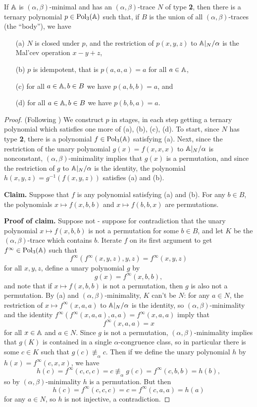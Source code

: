 \begin{appendices}
\begin{lem}\label{lem-pseudo-malcev} If $\mathbb{A}$ is $(\alpha,\beta)$-minimal and has an $(\alpha,\beta)$-trace $N$ of type \textbf{2}, then there is a ternary polynomial $p \in \operatorname{Pol}_3(\mathbb{A})$ such that, if $B$ is the union of all $(\alpha,\beta)$-traces (the ``body''), we have
\begin{itemize}
\item[(a)] $N$ is closed under $p$, and the restriction of $p(x,y,z)$ to $\mathbb{A}|_N/\alpha$ is the Mal'cev operation $x - y + z$,
\item[(b)] $p$ is idempotent, that is $p(a,a,a) = a$ for all $a \in \mathbb{A}$,
\item[(c)] for all $a \in \mathbb{A}, b \in B$ we have $p(a,b,b) = a$, and
\item[(d)] for all $a \in \mathbb{A}, b \in B$ we have $p(b,b,a) = a$.
\end{itemize}
\end{lem}
\begin{proof} (Following \cite{hobby-mckenzie}) We construct $p$ in stages, in each step getting a ternary polynomial which satisfies one more of (a), (b), (c), (d). To start, since $N$ has type \textbf{2}, there is a polynomial $f \in \operatorname{Pol}_3(\mathbb{A})$ satisfying (a). Next, since the restriction of the unary polynomial $g(x) = f(x,x,x)$ to $\mathbb{A}|_N/\alpha$ is nonconstant, $(\alpha,\beta)$-minimality implies that $g(x)$ is a permutation, and since the restriction of $g$ to $\mathbb{A}|_N/\alpha$ is the identity, the polynomial $h(x,y,z) = g^{-1}(f(x,y,z))$ satisfies (a) and (b).

{\bf Claim.} Suppose that $f$ is any polynomial satisfying (a) and (b). For any $b \in B$, the polynomials $x \mapsto f(x,b,b)$ and $x \mapsto f(b,b,x)$ are permutations.

{\bf Proof of claim.} Suppose not - suppose for contradiction that the unary polynomial $x \mapsto f(x,b,b)$ is not a permutation for some $b \in B$, and let $K$ be the $(\alpha,\beta)$-trace which contains $b$. Iterate $f$ on its first argument to get $f^\infty \in \operatorname{Pol}_3(\mathbb{A})$ such that
\[
f^\infty(f^\infty(x,y,z),y,z) = f^\infty(x,y,z)
\]
for all $x,y,z$, define a unary polynomial $g$ by
\[
g(x) = f^\infty(x,b,b),
\]
and note that if $x \mapsto f(x,b,b)$ is not a permutation, then $g$ is also not a permutation. By (a) and $(\alpha,\beta)$-minimality, $K$ can't be $N$: for any $a \in N$, the restriction of $x \mapsto f^\infty(x,a,a)$ to $\mathbb{A}|_N/\alpha$ is the identity, so $(\alpha,\beta)$-minimality and the identity $f^\infty(f^\infty(x,a,a),a,a) = f^\infty(x,a,a)$ imply that
\[
f^\infty(x,a,a) = x
\]
for all $x \in \mathbb{A}$ and $a \in N$. Since $g$ is not a permutation, $(\alpha,\beta)$-minimality implies that $g(K)$ is contained in a single $\alpha$-congruence class, so in particular there is some $c \in K$ such that $g(c) \not\equiv_\alpha c$. Then if we define the unary polynomial $h$ by $h(x) = f^\infty(c,x,x)$, we have
\[
h(c) = f^\infty(c,c,c) = c \not\equiv_\alpha g(c) = f^\infty(c,b,b) = h(b),
\]
so by $(\alpha,\beta)$-minimality $h$ is a permutation. But then
\[
h(c) = f^\infty(c,c,c) = c = f^\infty(c,a,a) = h(a)
\]
for any $a \in N$, so $h$ is not injective, a contradiction.


\end{proof}
\end{appendices}

